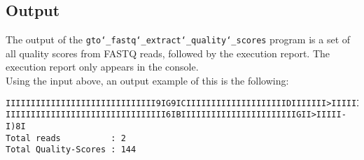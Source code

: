 \subsection*{Output}
The output of the \texttt{gto\char`_fastq\char`_extract\char`_quality\char`_scores} program is a set of all quality scores from FASTQ reads, followed by the execution report.
The execution report only appears in the console.\\
Using the input above, an output example of this is the following:
\begin{lstlisting}
IIIIIIIIIIIIIIIIIIIIIIIIIIIIII9IG9ICIIIIIIIIIIIIIIIIIIIIDIIIIIII>IIIIII/
IIIIIIIIIIIIIIIIIIIIIIIIIIIIIIII6IBIIIIIIIIIIIIIIIIIIIIIIIGII>IIIII-I)8I
Total reads          : 2
Total Quality-Scores : 144
\end{lstlisting}
